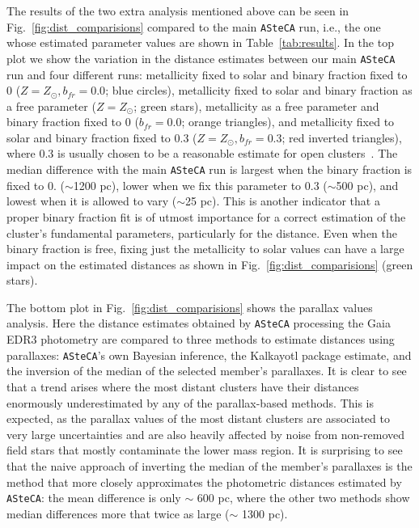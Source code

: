 \documentclass[referee]{aa}
\begin{document}
  The results of the two extra analysis mentioned above can be seen in
  Fig.~\ref{fig:dist_comparisions} compared to the main \texttt{ASteCA} run,
  i.e., the one whose estimated parameter values are shown in
  Table~\ref{tab:results}.
  In the top plot we show the variation in the distance estimates between our
  main \texttt{ASteCA} run and four different runs: metallicity fixed to solar
  and binary fraction fixed to 0 ($Z=Z_{\odot},b_{fr}=0.0$; blue circles),
  metallicity fixed to solar and binary fraction as a free parameter
  ($Z=Z_{\odot}$; green stars), metallicity as a free parameter and binary
  fraction fixed to 0 ($b_{fr}=0.0$; orange triangles), and metallicity fixed to
  solar and binary fraction fixed to 0.3 ($Z=Z_{\odot},b_{fr}=0.3$; red
  inverted triangles), where 0.3 is usually chosen to be a reasonable estimate
  for open clusters~\citep{Sollima_2010}. The median difference with the main
  \texttt{ASteCA} run is largest when the binary fraction is fixed to 0. 
  ($\sim$1200 pc), lower when we fix this parameter to 0.3 ($\sim$500 pc),
  and lowest when it is allowed to vary ($\sim$25 pc). This is another indicator
  that a proper binary fraction fit is of utmost importance for a correct
  estimation of the cluster's fundamental parameters, particularly for the
  distance. Even when the binary fraction is free, fixing just the metallicity
  to solar values can have a large impact on the estimated distances as shown in
  Fig.~\ref{fig:dist_comparisions} (green stars).


  The bottom plot in Fig.~\ref{fig:dist_comparisions} shows the parallax values
  analysis. Here the distance estimates obtained by \texttt{ASteCA} processing
  the Gaia EDR3 photometry are compared to three methods to estimate distances
  using parallaxes: \texttt{ASteCA}'s own Bayesian inference, the Kalkayotl
  package estimate, and the inversion of the median of the selected member's
  parallaxes. It is clear to see that a trend arises where the most distant
  clusters have their distances enormously underestimated by any of the
  parallax-based methods. This is expected, as the parallax values of the most
  distant clusters are associated to very large uncertainties and are also
  heavily affected by noise from non-removed field stars that mostly contaminate
  the lower mass region.
  It is surprising to see that the naive approach of inverting the median of
  the member's parallaxes is the method that more closely approximates the
  photometric distances estimated by \texttt{ASteCA}: the mean difference is
  only $\sim$ 600 pc, where the other two methods show median differences more
  that twice as large ($\sim$ 1300 pc).
  \\
\end{document}
